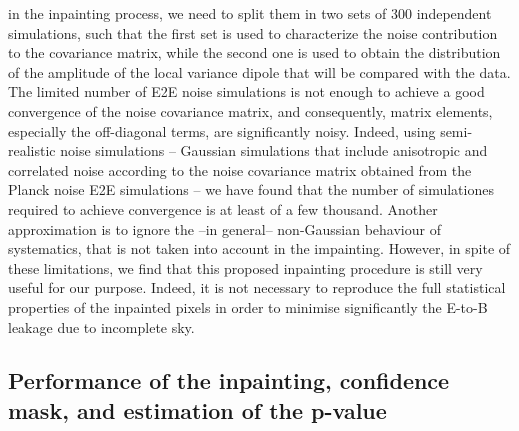 in the inpainting process, we need to split them in two sets of 300 independent simulations, such that the first set is used to characterize the noise contribution to the covariance matrix, while the second one is used to obtain the distribution of the amplitude of the local variance dipole that will be compared with the data. 
The limited number of E2E noise simulations is not enough to achieve a good convergence of the noise covariance matrix, and consequently, matrix elements, especially the off-diagonal terms, are 
 significantly noisy. Indeed, using semi-realistic noise simulations -- Gaussian simulations that include anisotropic and correlated noise according to the noise covariance matrix obtained from the Planck noise E2E simulations -- we have found that the number of simulationes required to achieve convergence is at least of a few thousand. Another approximation is to ignore the --in general-- non-Gaussian behaviour of systematics, that is not taken into account in the impainting. However, in spite of these limitations, 
 we find that this proposed inpainting procedure is still very useful for our purpose.
Indeed, it is not necessary to reproduce the full statistical properties of the inpainted pixels in order to minimise significantly the E-to-B leakage due to incomplete sky.

\subsection{Performance of the inpainting, confidence mask, and estimation of the p-value}\label{subsection:3.2}


